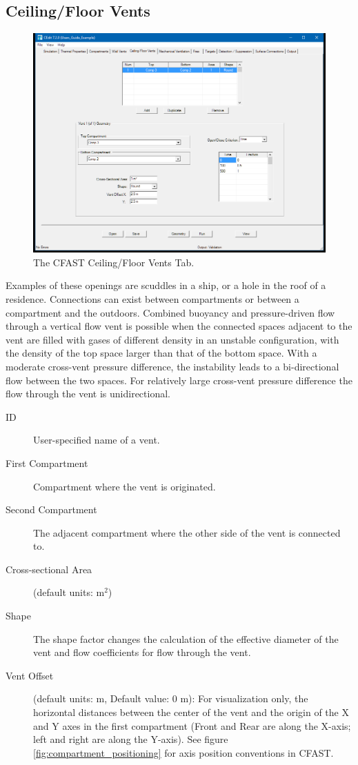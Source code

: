 \subsection{Ceiling/Floor Vents}
\label{info:VENT2}
\begin{figure}[h!]
\includegraphics[width=6.5in]{FIGURES/Vertical_Flow_Tab}
\caption[The CFAST Ceiling/Floor Vents Tab]{The CFAST Ceiling/Floor Vents Tab.}
\end{figure}

Examples of these openings are scuddles in a ship, or a hole in the roof of a residence. Connections can exist between compartments or between a compartment and the outdoors. Combined buoyancy and pressure-driven flow through a vertical flow vent is possible when the connected spaces adjacent to the vent are filled with gases of different density in an unstable configuration, with the density of the top space larger than that of the bottom space. With a moderate cross-vent pressure difference, the instability leads to a bi-directional flow between the two spaces. For relatively large cross-vent pressure difference the flow through the vent is unidirectional.

\begin{description}
\item[ID] User-specified name of a vent.
\item[First Compartment] Compartment where the vent is originated.
\item[Second Compartment] The adjacent compartment where the other side of the vent is connected to.
\label{Ceil Cross-sectional Area}
\item[Cross-sectional Area] (default units: m$^2$)
\label{Ceil Shape}
\item[Shape] The shape factor changes the calculation of the effective diameter of the vent and flow coefficients for flow through the vent.
\item[Vent Offset] (default units: m, Default value: 0 m): For visualization only, the horizontal distances between the center of the vent and the origin of the X and Y axes in the first compartment (Front and Rear are along the X-axis; left and right are along the Y-axis). See figure \ref{fig:compartment_positioning} for axis position conventions in CFAST.
\end{description}

